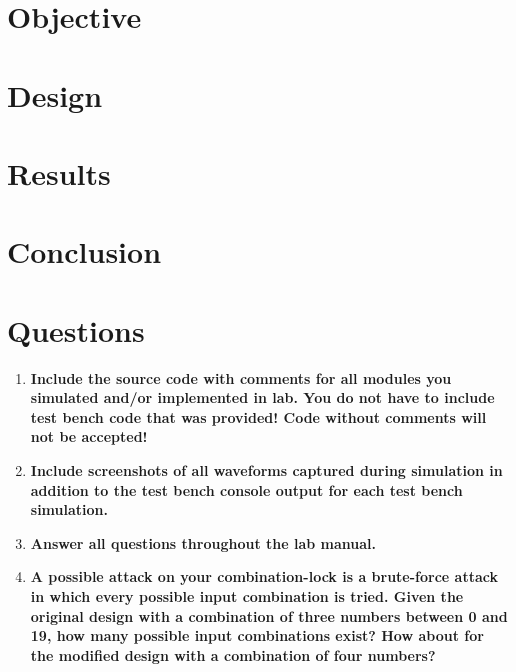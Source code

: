 \documentclass[a4paper,12pt]{article}
\begin{document}
\section*{Objective}

\section*{Design}

% 

\section*{Results}



\section*{Conclusion}


\section*{Questions}

\begin{enumerate}
  \item \textbf{Include the source code with comments for all modules you simulated and/or implemented in lab. You do not have to include test bench code that was provided! Code without comments will not be
accepted!}

  \item \textbf{Include screenshots of all waveforms captured during simulation in addition to the test bench console output for each test bench simulation.}

  \item \textbf{Answer all questions throughout the lab manual.}
  
  \item \textbf{A possible attack on your combination-lock is a brute-force attack in which every possible input combination is tried. Given the original design with a combination of three numbers between 0 and 19, how many possible input combinations exist? How about for the modified design with a combination of four numbers?}
\end{enumerate}
\end{document}
